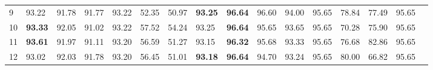 \documentclass{article}
\theoremstyle{definition}
\theoremstyle{remark}
\begin{document}
\begin{table}[]
\begin{tabular}{| p{0.5cm}|p{0.6cm}|p{0.7cm}|p{0.7cm}|p{0.6cm}|p{0.6cm}|p{0.6cm}|p{0.6cm}|p{0.6cm}|p{0.7cm}|p{0.7cm}|p{0.6cm}|p{0.6cm}|p{0.6cm}|p{0.6cm}|p{0.6cm}|}
9	& 93.22&	91.78&	91.77&	93.22&	52.35&	50.97&	\textbf{93.25}&	\textbf{96.64}&	96.60&	94.00&	95.65&	78.84&	77.49&	95.65\\
10	& \textbf{93.33}&	92.05&	91.02&	93.22&	57.52&	54.24&	93.25&	\textbf{96.64}&	95.65&	93.65&	95.65&	70.28&	75.90&	95.65\\
11	& \textbf{93.61}&	91.97&	91.11&	93.20&	56.59&	51.27&	93.15&	\textbf{96.32}&	95.68&	93.33&	95.65&	76.68&	82.86&	95.65\\
12	& 93.02&	92.03&	91.78&	93.20&	56.45&	51.01&	\textbf{93.18}&	\textbf{96.64}&	94.70&	93.24&	95.65&	80.00&	66.82&	95.65\\ \hline
    \end{tabular}
    \end{table}
\end{document}
